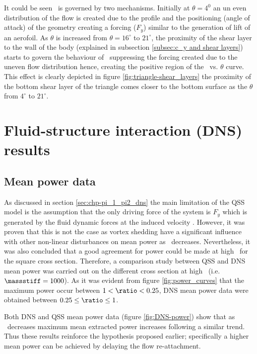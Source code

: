 It could be seen \cy\ is governed by two mechanisms. Initially at $\theta= 4^{0}$ an un even distribution of the flow is created due to the profile and the positioning (angle of attack) of the geometry creating a forcing ($F_{y}$) similar to the generation of lift of an aerofoil.
As $\theta$ is increased from $\theta=16^{\circ}$ to $21^{\circ}$, the proximity of the shear layer to the wall of the body (explained in subsection \ref{subsec:c_y and shear layers}) starts to govern the behaviour of \cy\ suppressing the forcing created due to the uneven flow distribution hence, creating the positive region of the \cy\ vs. $\theta$ curve. This effect is clearly depicted in figure \ref{fig:triangle-shear_layers} the proximity of the bottom shear layer of the triangle comes closer to the bottom surface as the $\theta$ from $4^{\circ}$ to $21^{\circ}$.  


\section{Fluid-structure interaction (DNS) results}
\label{sec:cross-sec-FSI-results}

\subsection{Mean power data}
\label{subsec:cross-sec-dns-mean-power}

As discussed in section \ref{sec:chp-pi_1_pi2_dns} the main limitation of the QSS model is the assumption that the only driving force of the system is $F_{y}$ which is generated by the fluid dynamic forces at the induced velocity . However, it was proven that this is not the case as vortex shedding have a significant influence with other non-linear disturbances on mean power as \massstiff\ decreases. Nevertheless, it was also concluded that a good agreement for power could be made at high \massstiff\ for the square cross section. Therefore, a comparison study between QSS and DNS mean power was carried out on the different cross section at high \massstiff\ (i.e.$\massstiff=1000$). As it was evident from figure \ref{fig:power_curves} that the maximum power occur between $1<\ratio<0.25$, DNS mean power data were obtained between $0.25\leq\ratio\leq1$.   

Both  DNS and QSS mean power data (figure \ref{fig:DNS-power}) show that as \ratio\ decreases maximum mean extracted power increases following a similar trend. Thus these results reinforce the hypothesis proposed earlier; specifically a higher mean power can be achieved by delaying the flow re-attachment. 

